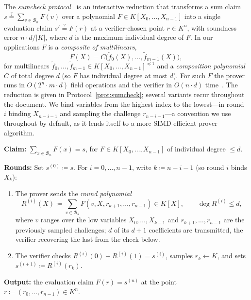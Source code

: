 \documentclass{article}
\theoremstyle{definition}
\newcommand*{\mlin}{{\preceq 1}}
\newcommand*{\mle}{\widetilde}
\newcommand{\BB}{\mathcal{B}}
\begin{document}
The \emph{sumcheck protocol}~\cite{Lund:1992aa,Thaler:2022aa} is an interactive reduction that transforms a sum claim $s \stackrel{?}{=} \sum_{v \in \BB_n} F(v)$ over a polynomial $F \in K[X_0, \ldots, X_{n - 1}]$ into a single evaluation claim $s' \stackrel{?}{=} F(r)$ at a verifier-chosen point $r \in K^n$, with soundness error $n \cdot d / |K|$, where $d$ is the maximum individual degree of $F$. In our applications $F$ is a \emph{composite of multilinears},
\[
  F(X) = C\bigl(\mle{f}_0(X), \ldots, \mle{f}_{m - 1}(X)\bigr),
\]
for multilinears $\mle{f}_0, \ldots, \mle{f}_{m - 1} \in K[X_0, \ldots, X_{n - 1}]^\mlin$ and a \emph{composition polynomial} $C$ of total degree $d$ (so $F$ has individual degree at most $d$). For such $F$ the prover runs in $O(2^n \cdot m \cdot d)$ field operations and the verifier in $O(n \cdot d)$ time~\cite[\S 3]{Gruen:2024aa}. The reduction is given in Protocol~\ref{prot:sumcheck}; several variants recur throughout the document. We bind variables from the highest index to the lowest---in round $i$ binding $X_{n - i - 1}$ and sampling the challenge $r_{n - i - 1}$---a convention we use throughout by default, as it lends itself to a more SIMD-efficient prover algorithm.

\begin{protocol}[Sumcheck]
\label{prot:sumcheck}
\textbf{Claim:} $\sum_{x \in \BB_n} F(x) = s$, for $F \in K[X_0, \ldots, X_{n - 1}]$ of individual degree $\le d$.

\textbf{Rounds:} Set $s^{(0)} \coloneqq s$. For $i = 0, \ldots, n - 1$, write $k \coloneqq n - i - 1$ (so round $i$ binds $X_k$):
\begin{enumerate}
\item The prover sends the \emph{round polynomial}
\[
  R^{(i)}(X) \coloneqq \sum_{v \in \BB_k} F(v, X, r_{k + 1}, \ldots, r_{n - 1}) \in K[X], \qquad \deg R^{(i)} \le d,
\]
where $v$ ranges over the low variables $X_0, \ldots, X_{k - 1}$ and $r_{k + 1}, \ldots, r_{n - 1}$ are the previously sampled challenges; $d$ of its $d + 1$ coefficients are transmitted, the verifier recovering the last from the check below.
\item The verifier checks $R^{(i)}(0) + R^{(i)}(1) = s^{(i)}$, samples $r_k \gets K$, and sets $s^{(i + 1)} \coloneqq R^{(i)}(r_k)$.
\end{enumerate}

\textbf{Output:} the evaluation claim $F(r) = s^{(n)}$ at the point $r \coloneqq (r_0, \ldots, r_{n - 1}) \in K^n$.
\end{protocol}
\end{document}
